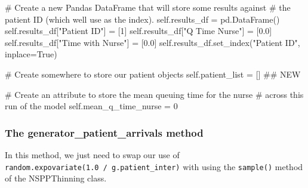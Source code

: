 \documentclass[
  letterpaper,
  DIV=11,
  numbers=noendperiod]{scrreprt}
\newenvironment{Shaded}{\begin{snugshade}}{\end{snugshade}}
\newcommand{\CommentTok}[1]{\textcolor[rgb]{0.37,0.37,0.37}{#1}}
\newcommand{\DecValTok}[1]{\textcolor[rgb]{0.68,0.00,0.00}{#1}}
\newcommand{\FloatTok}[1]{\textcolor[rgb]{0.68,0.00,0.00}{#1}}
\newcommand{\NormalTok}[1]{\textcolor[rgb]{0.00,0.23,0.31}{#1}}
\newcommand{\OperatorTok}[1]{\textcolor[rgb]{0.37,0.37,0.37}{#1}}
\newcommand{\StringTok}[1]{\textcolor[rgb]{0.13,0.47,0.30}{#1}}
\newcommand{\VariableTok}[1]{\textcolor[rgb]{0.07,0.07,0.07}{#1}}
\begin{document}
\begin{Shaded}
\begin{Highlighting}[]
        \CommentTok{\# Create a new Pandas DataFrame that will store some results against}
        \CommentTok{\# the patient ID (which we\textquotesingle{}ll use as the index).}
        \VariableTok{self}\NormalTok{.results\_df }\OperatorTok{=}\NormalTok{ pd.DataFrame()}
        \VariableTok{self}\NormalTok{.results\_df[}\StringTok{"Patient ID"}\NormalTok{] }\OperatorTok{=}\NormalTok{ [}\DecValTok{1}\NormalTok{]}
        \VariableTok{self}\NormalTok{.results\_df[}\StringTok{"Q Time Nurse"}\NormalTok{] }\OperatorTok{=}\NormalTok{ [}\FloatTok{0.0}\NormalTok{]}
        \VariableTok{self}\NormalTok{.results\_df[}\StringTok{"Time with Nurse"}\NormalTok{] }\OperatorTok{=}\NormalTok{ [}\FloatTok{0.0}\NormalTok{]}
        \VariableTok{self}\NormalTok{.results\_df.set\_index(}\StringTok{"Patient ID"}\NormalTok{, inplace}\OperatorTok{=}\VariableTok{True}\NormalTok{)}

        \CommentTok{\# Create somewhere to store our patient objects}
        \VariableTok{self}\NormalTok{.patient\_list }\OperatorTok{=}\NormalTok{ [] }\CommentTok{\#\# NEW}

        \CommentTok{\# Create an attribute to store the mean queuing time for the nurse}
        \CommentTok{\# across this run of the model}
        \VariableTok{self}\NormalTok{.mean\_q\_time\_nurse }\OperatorTok{=} \DecValTok{0}
\end{Highlighting}
\end{Shaded}

\subsubsection{The generator\_patient\_arrivals
method}\label{the-generator_patient_arrivals-method-1}

In this method, we just need to swap our use of
\texttt{random.expovariate(1.0\ /\ g.patient\_inter)} with using the
\texttt{sample()} method of the NSPPThinning class.
\end{document}
